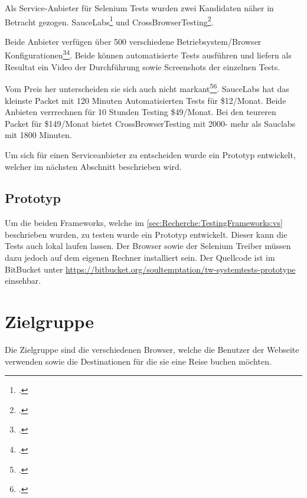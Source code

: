 Als Service-Anbieter für Selenium Tests wurden zwei Kandidaten näher in Betracht gezogen. SauceLabs\footcite{Sauce_Labs_2015-07-26} und CrossBrowserTesting\footcite{Cross_Browser_Testing_2015-07-26}.

Beide Anbieter verfügen über 500 verschiedene Betriebsystem/Browser Konfigurationen\footcite{Platforms_2015-07-26}\footcite{OS_Browser_Configurations_for_Cross_Browser_Compatibility_Testing_2015-07-26}. Beide können automatisierte Tests ausführen und liefern als Resultat ein Video der Durchführung sowie Screenshots der einzelnen Tests.

Vom Preis her unterscheiden sie sich auch nicht markant\footcite{Sauce_Labs_Pricing_2015-07-26}\footcite{Test_your_site_on_all_browsers_2015-07-26}. SauceLabs hat das kleinste Packet mit 120 Minuten Automatisierten Tests für \$12/Monat. Beide Anbieten verrrechnen für 10 Stunden Testing \$49/Monat. Bei den teureren Packet für \$149/Monat bietet CrossBrowserTesting mit 2000- mehr als Sauclabs mit 1800 Minuten.

Um sich für einen Serviceanbieter zu entscheiden wurde ein Prototyp entwickelt, welcher im nächsten Abschnitt beschrieben wird.

\subsection{Prototyp}
\label{sec:Recherche:TestingFrameworks:Prototyp}
Um die beiden Frameworks, welche im \cref{sec:Recherche:TestingFrameworks:vs}  beschrieben wurden, zu testen wurde ein Prototyp entwickelt. Dieser kann die Tests auch lokal laufen lassen. Der Browser sowie der Selenium Treiber müssen dazu jedoch auf dem eigenen Rechner installiert sein. Der Quellcode ist im BitBucket unter \url{https://bitbucket.org/soultemptation/tw-systemtests-prototype} einsehbar.

\section{Zielgruppe}
Die Zielgruppe sind die verschiedenen Browser, welche die Benutzer der Webseite verwenden sowie die Destinationen für die sie eine Reise buchen möchten.

